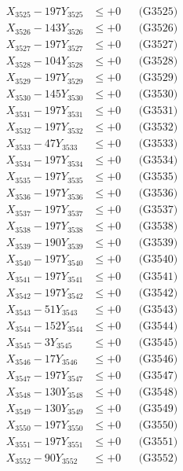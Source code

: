 \documentclass[a4paper,10pt]{article}
\begin{document}
{\begin{align}
X_{3525} - 197Y_{3525} &\leq +0 && \text{(G3525)} \\
X_{3526} - 143Y_{3526} &\leq +0 && \text{(G3526)} \\
X_{3527} - 197Y_{3527} &\leq +0 && \text{(G3527)} \\
X_{3528} - 104Y_{3528} &\leq +0 && \text{(G3528)} \\
X_{3529} - 197Y_{3529} &\leq +0 && \text{(G3529)} \\
X_{3530} - 145Y_{3530} &\leq +0 && \text{(G3530)} \\
\allowbreak
X_{3531} - 197Y_{3531} &\leq +0 && \text{(G3531)} \\
X_{3532} - 197Y_{3532} &\leq +0 && \text{(G3532)} \\
X_{3533} - 47Y_{3533} &\leq +0 && \text{(G3533)} \\
X_{3534} - 197Y_{3534} &\leq +0 && \text{(G3534)} \\
X_{3535} - 197Y_{3535} &\leq +0 && \text{(G3535)} \\
X_{3536} - 197Y_{3536} &\leq +0 && \text{(G3536)} \\
X_{3537} - 197Y_{3537} &\leq +0 && \text{(G3537)} \\
X_{3538} - 197Y_{3538} &\leq +0 && \text{(G3538)} \\
X_{3539} - 190Y_{3539} &\leq +0 && \text{(G3539)} \\
X_{3540} - 197Y_{3540} &\leq +0 && \text{(G3540)} \\
\allowbreak
X_{3541} - 197Y_{3541} &\leq +0 && \text{(G3541)} \\
X_{3542} - 197Y_{3542} &\leq +0 && \text{(G3542)} \\
X_{3543} - 51Y_{3543} &\leq +0 && \text{(G3543)} \\
X_{3544} - 152Y_{3544} &\leq +0 && \text{(G3544)} \\
X_{3545} - 3Y_{3545} &\leq +0 && \text{(G3545)} \\
X_{3546} - 17Y_{3546} &\leq +0 && \text{(G3546)} \\
X_{3547} - 197Y_{3547} &\leq +0 && \text{(G3547)} \\
X_{3548} - 130Y_{3548} &\leq +0 && \text{(G3548)} \\
X_{3549} - 130Y_{3549} &\leq +0 && \text{(G3549)} \\
X_{3550} - 197Y_{3550} &\leq +0 && \text{(G3550)} \\
\allowbreak
X_{3551} - 197Y_{3551} &\leq +0 && \text{(G3551)} \\
X_{3552} - 90Y_{3552} &\leq +0 && \text{(G3552)} \\

\end{align}}
\end{document}
